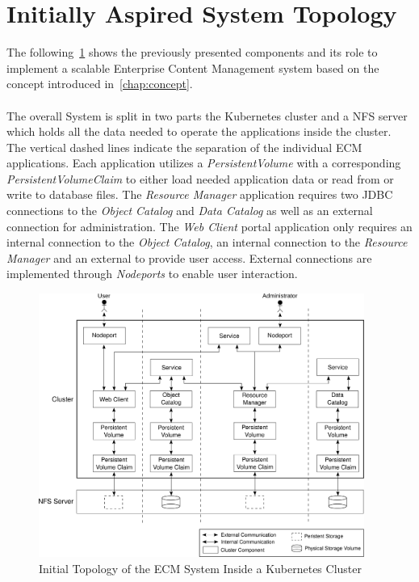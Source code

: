 \section{Initially Aspired System Topology}
\label{sec:init_topo}
The following~\cref{fig:init_topology} shows the previously presented components and its role to implement a scalable Enterprise Content Management system based on the concept introduced in~\cref{chap:concept}.
\\
\\
The overall System is split in two parts the Kubernetes cluster and a NFS server which holds all the data needed to operate the applications inside the cluster.
The vertical dashed lines indicate the separation of the individual ECM applications.
Each application utilizes a \textit{PersistentVolume} with a corresponding \textit{PersistentVolumeClaim} to either load needed application data or read from or write to database files.
The \textit{Resource Manager} application requires two JDBC connections to the \textit{Object Catalog} and \textit{Data Catalog} as well as an external connection for administration.
The \textit{Web Client} portal application only requires an internal connection to the \textit{Object Catalog}, an internal connection to the \textit{Resource Manager} and an external to provide user access.
External connections are implemented through \textit{Nodeports} to enable user interaction.

\begin{figure}[h]
    \centering
    \includegraphics[width=0.95\textwidth]{graphics/initial_topology.svg}
    \caption{Initial Topology of the ECM System Inside a Kubernetes Cluster}
    \label{fig:init_topology}
\end{figure}

